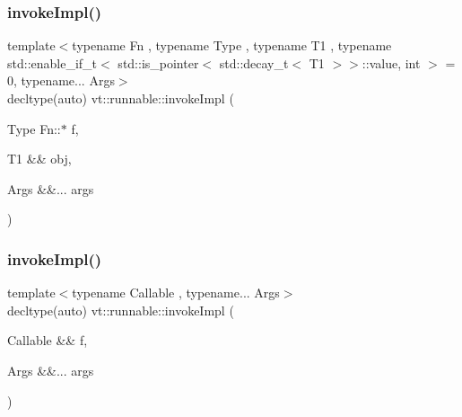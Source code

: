 \mbox{\label{namespacevt_1_1runnable_a4253e4fa9c8c6e68da420ab440f2b298}} 
\subsubsection{\texorpdfstring{invoke\+Impl()}{invokeImpl()}\hspace{0.1cm}{\footnotesize\ttfamily [1/2]}}
{\footnotesize\ttfamily template$<$typename Fn , typename Type , typename T1 , typename std\+::enable\+\_\+if\+\_\+t$<$ std\+::is\+\_\+pointer$<$ std\+::decay\+\_\+t$<$ T1 $>$$>$\+::value, int $>$  = 0, typename... Args$>$ \\
decltype(auto) vt\+::runnable\+::invoke\+Impl (\begin{DoxyParamCaption}\item[{Type Fn\+::$\ast$}]{f,  }\item[{T1 \&\&}]{obj,  }\item[{Args \&\&...}]{args }\end{DoxyParamCaption})}

\mbox{\label{namespacevt_1_1runnable_af14b1c72fc3bf8437c2b89021af7eecf}} 
\subsubsection{\texorpdfstring{invoke\+Impl()}{invokeImpl()}\hspace{0.1cm}{\footnotesize\ttfamily [2/2]}}
{\footnotesize\ttfamily template$<$typename Callable , typename... Args$>$ \\
decltype(auto) vt\+::runnable\+::invoke\+Impl (\begin{DoxyParamCaption}\item[{Callable \&\&}]{f,  }\item[{Args \&\&...}]{args }\end{DoxyParamCaption})}

